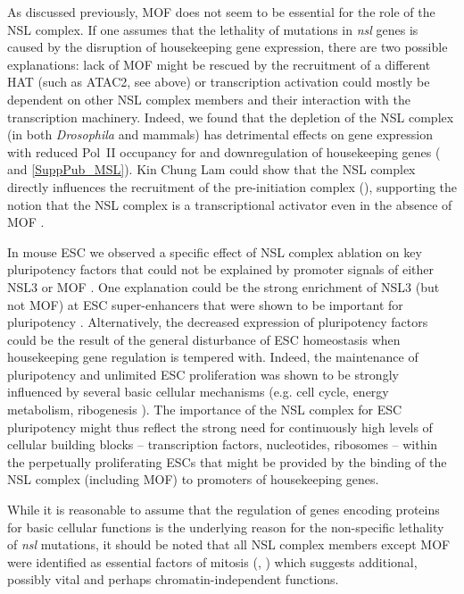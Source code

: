 As discussed previously, MOF does not seem to be essential for the role of the NSL complex. If one assumes that the lethality of mutations in \textit{nsl} genes is caused by the disruption of housekeeping gene expression, there are two possible explanations: lack of MOF might be rescued by the recruitment of a different HAT (such as ATAC2, see above) or transcription activation could mostly be dependent on other NSL complex members and their interaction with the transcription machinery. Indeed, we found that the depletion of the NSL complex (in both \textit{Drosophila} and mammals) has detrimental effects on gene expression with reduced Pol~II occupancy for and downregulation of housekeeping genes ( and \ref{SuppPub_MSL}). Kin Chung Lam could show that the NSL complex directly influences the recruitment of the pre-initiation complex (), supporting the notion that the NSL complex is a transcriptional activator even in the absence of MOF \citep{Raja2010}.

In mouse ESC we observed a specific effect of NSL complex ablation on key pluripotency factors that could not be explained by promoter signals of either NSL3 or MOF \citep{Chelmicki2014, Ravens2014}. One explanation could be the strong enrichment of NSL3 (but not MOF) at ESC super-enhancers that were shown to be important for pluripotency \citep{Whyte2013}. Alternatively, the decreased expression of pluripotency factors could be the result of the general disturbance of ESC homeostasis when housekeeping gene regulation is tempered with. Indeed, the maintenance of pluripotency and unlimited ESC proliferation was shown to be strongly influenced by several basic cellular mechanisms (e.g. cell cycle, energy metabolism, ribogenesis \citep{Folmes2012, Koledova2010, Watanabe2014}). The importance of the NSL complex for ESC pluripotency might thus reflect the strong need for continuously high levels of cellular building blocks -- transcription factors, nucleotides, ribosomes -- within the perpetually proliferating ESCs that might be provided by the binding of the NSL complex (including MOF) to promoters of housekeeping genes.

While it is reasonable to assume that the regulation of genes encoding proteins for basic cellular functions is the underlying reason for the non-specific lethality of \textit{nsl} mutations, it should be noted that all NSL complex members except MOF were identified as essential factors of mitosis (, ) which suggests additional, possibly vital and perhaps chromatin-independent functions.
%
